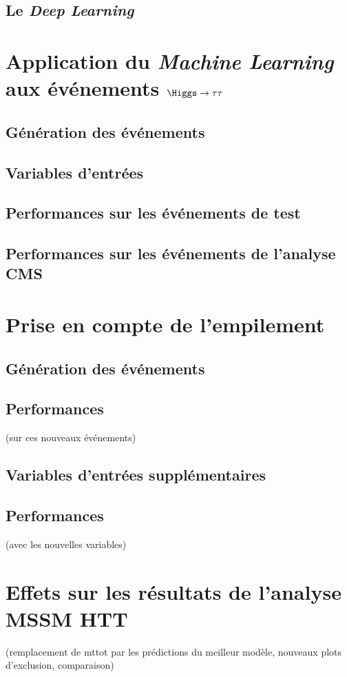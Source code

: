 \subsection{Le \emph{Deep Learning}}

\section{Application du \emph{Machine Learning} aux événements $\Higgs\to\tau\tau$}
\subsection{Génération des événements}
\subsection{Variables d'entrées}
\subsection{Performances sur les événements de test}
\subsection{Performances sur les événements de l'analyse CMS}

\section{Prise en compte de l'empilement}
\subsection{Génération des événements}
\subsection{Performances} (sur ces nouveaux événements)
\subsection{Variables d'entrées supplémentaires}
\subsection{Performances} (avec les nouvelles variables)

\section{Effets sur les résultats de l'analyse MSSM HTT}
(remplacement de mttot par les prédictions du meilleur modèle, nouveaux plots d'exclusion, comparaison)

